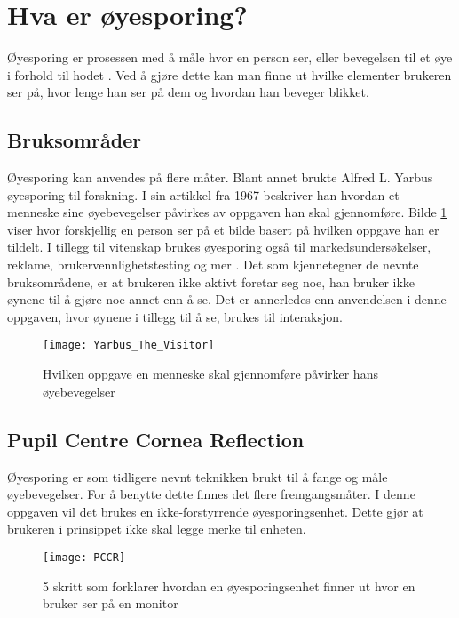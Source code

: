 \section{Hva er øyesporing?}

Øyesporing er prosessen med å måle hvor en person ser, eller bevegelsen til et øye i forhold til hodet \cite{Eyet4:online}. Ved å gjøre dette kan man finne ut hvilke elementer brukeren ser på, hvor lenge han ser på dem og hvordan han beveger blikket. 


\subsection{Bruksområder}

Øyesporing kan anvendes på flere måter. Blant annet brukte Alfred L. Yarbus øyesporing til forskning. I sin artikkel fra 1967 \cite{wexle4:online} beskriver han hvordan et menneske sine øyebevegelser påvirkes av oppgaven han skal gjennomføre. Bilde \ref{fig:yarbus} viser hvor forskjellig en person ser på et bilde basert på hvilken oppgave han er tildelt. I tillegg til vitenskap brukes øyesporing også til markedsundersøkelser, reklame, brukervennlighetstesting og mer \cite{Case2:online}. Det som kjennetegner de nevnte bruksområdene, er at brukeren ikke aktivt foretar seg noe, han bruker ikke øynene til å gjøre noe annet enn å se. Det er annerledes enn anvendelsen i denne oppgaven, hvor øynene i tillegg til å se, brukes til interaksjon.

\begin{figure}[ht!]
\centering
\texttt{[image: Yarbus\_The\_Visitor]}
\caption{Hvilken oppgave en menneske skal gjennomføre påvirker hans øyebevegelser \cite{Yarbu2:online}}
\label{fig:yarbus}
\end{figure}


\subsection{Pupil Centre Cornea Reflection}

Øyesporing er som tidligere nevnt teknikken brukt til å fange og måle øyebevegelser. For å benytte dette finnes det flere fremgangsmåter. I denne oppgaven vil det brukes en ikke-forstyrrende øyesporingsenhet. Dette gjør at brukeren i prinsippet ikke skal legge merke til enheten. 

\begin{figure}[ht!]
\centering
\texttt{[image: PCCR]}
\caption{5 skritt som forklarer hvordan en øyesporingsenhet finner ut hvor en bruker ser på en monitor \cite{Under3:online}}
\label{fig:PCCR}
\end{figure}

